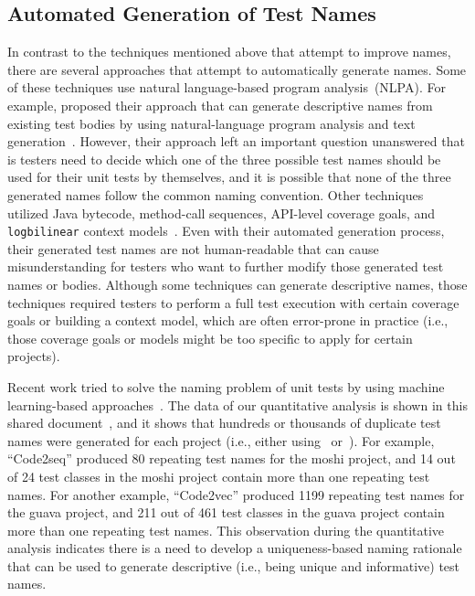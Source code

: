 \subsection{Automated Generation of Test Names}

In contrast to the techniques mentioned above that attempt to improve names, there are several approaches that attempt to automatically generate names.
%
Some of these techniques use natural language-based program analysis~(NLPA).
%
For example, \citeauthor{zhang2016towards} proposed their approach that can generate descriptive names from existing test bodies by using natural-language program analysis and text generation~\cite{zhang2016towards}.
%
However, their approach left an important question unanswered that is testers need to decide which one of the three possible test names should be used for their unit tests by themselves, and it is possible that none of the three generated names follow the common naming convention.
%
Other techniques utilized Java bytecode, method-call sequences, API-level coverage goals, and \texttt{logbilinear} context models~\cite{fraser2011evosuite,thummalapenta2009mseqgen,daka2017generating,allamanis2015suggesting}.
%
Even with their automated generation process, their generated test names are not human-readable that can cause misunderstanding for testers who want to further modify those generated test names or bodies.
Although some techniques can generate descriptive names, those techniques required testers to perform a full test execution with certain coverage goals or building a context model, which are often error-prone in practice (i.e., those coverage goals or models might be too specific to apply for certain projects).

Recent work tried to solve the naming problem of unit tests by using machine learning-based approaches~\cite{alon2018code2seq, alon2019code2vec}.
%
The data of our quantitative analysis is shown in this shared document~\cite{CodeResult}, and it shows that hundreds or thousands of duplicate test names were generated for each project (i.e., either using~\cite{alon2018code2seq} or~\cite{alon2019code2vec}).
%
For example, \enquote{Code2seq} produced \num{80} repeating test names for the moshi project, and \num{14} out of \num{24} test classes in the moshi project contain more than one repeating test names.
%
For another example, \enquote{Code2vec} produced \num{1199} repeating test names for the guava project, and \num{211} out of \num{461} test classes in the guava project contain more than one repeating test names.
%
This observation during the quantitative analysis indicates there is a need to develop a uniqueness-based naming rationale that can be used to generate descriptive (i.e., being unique and informative) test names.


